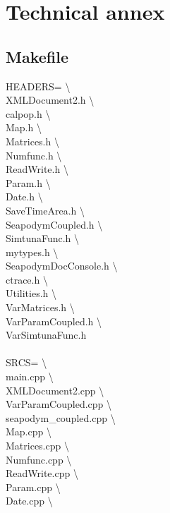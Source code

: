 \chapter{Technical annex}\label{ch:appendix-config}

\section{Makefile}

HEADERS= \textbackslash \\
XMLDocument2.h \textbackslash \\
calpop.h \textbackslash \\
Map.h \textbackslash \\
Matrices.h \textbackslash \\
Numfunc.h \textbackslash \\
ReadWrite.h \textbackslash \\
Param.h \textbackslash \\
Date.h \textbackslash \\
SaveTimeArea.h \textbackslash \\
SeapodymCoupled.h \textbackslash \\
SimtunaFunc.h \textbackslash \\
mytypes.h \textbackslash \\
SeapodymDocConsole.h \textbackslash \\
ctrace.h \textbackslash \\
Utilities.h \textbackslash \\
VarMatrices.h \textbackslash \\
VarParamCoupled.h \textbackslash \\
VarSimtunaFunc.h \\
\\
SRCS= \textbackslash \\
main.cpp \textbackslash \\
XMLDocument2.cpp \textbackslash \\
VarParamCoupled.cpp \textbackslash \\
seapodym\_coupled.cpp \textbackslash \\
Map.cpp \textbackslash \\
Matrices.cpp \textbackslash \\
Numfunc.cpp \textbackslash \\
ReadWrite.cpp \textbackslash \\
Param.cpp \textbackslash \\
Date.cpp \textbackslash \\

